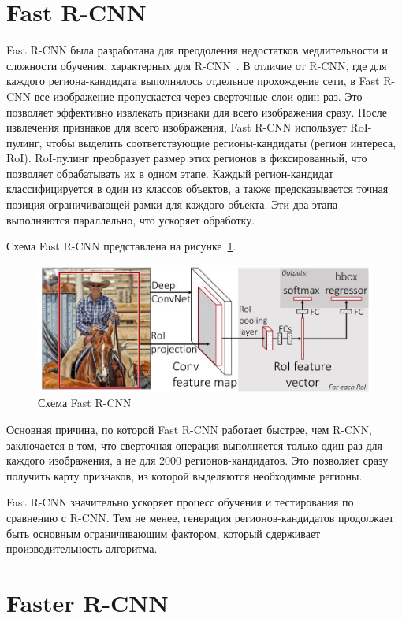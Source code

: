 \section{Fast R-CNN}

Fast R-CNN была разработана для преодоления недостатков медлительности и сложности обучения, характерных для R-CNN~\cite{fast_r-cnn}. В отличие от R-CNN, где для каждого региона-кандидата выполнялось отдельное прохождение сети, в Fast R-CNN все изображение пропускается через сверточные слои один раз. Это позволяет эффективно извлекать признаки для всего изображения сразу. После извлечения признаков для всего изображения, Fast R-CNN использует RoI-пулинг, чтобы выделить соответствующие регионы-кандидаты (регион интереса, RoI). RoI-пулинг преобразует размер этих регионов в фиксированный, что позволяет обрабатывать их в одном этапе. Каждый регион-кандидат классифицируется в один из классов объектов, а также предсказывается точная позиция ограничивающей рамки для каждого объекта. Эти два этапа выполняются параллельно, что ускоряет обработку.

Схема Fast R-CNN представлена на рисунке~\ref{fast_r-cnn_sheme}.

\begin{figure}[H]
    \centering
    \includegraphics[width=0.8\linewidth]{images/fast_r-cnn.png}
    \caption{Схема Fast R-CNN}
    \label{fast_r-cnn_sheme}
\end{figure}

Основная причина, по которой Fast R-CNN работает быстрее, чем R-CNN, заключается в том, что сверточная операция выполняется только один раз для каждого изображения, а не для 2000 регионов-кандидатов. Это позволяет сразу получить карту признаков, из которой выделяются необходимые регионы.

Fast R-CNN значительно ускоряет процесс обучения и тестирования по сравнению с R-CNN. Тем не менее, генерация регионов-кандидатов продолжает быть основным ограничивающим фактором, который сдерживает производительность алгоритма.

\section{Faster R-CNN}

